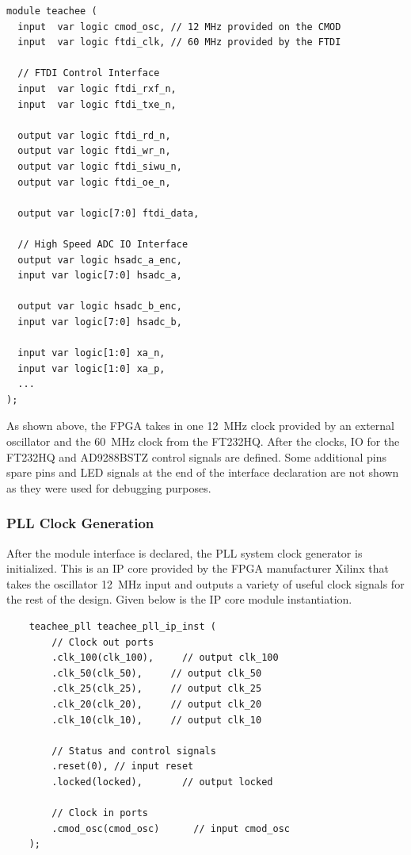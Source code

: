 \documentclass[letterpaper,11pt]{article}
\begin{document}
\begin{verbatim}
module teachee (
  input  var logic cmod_osc, // 12 MHz provided on the CMOD
  input  var logic ftdi_clk, // 60 MHz provided by the FTDI

  // FTDI Control Interface
  input  var logic ftdi_rxf_n,
  input  var logic ftdi_txe_n,

  output var logic ftdi_rd_n,
  output var logic ftdi_wr_n,
  output var logic ftdi_siwu_n,
  output var logic ftdi_oe_n,

  output var logic[7:0] ftdi_data,

  // High Speed ADC IO Interface
  output var logic hsadc_a_enc,
  input var logic[7:0] hsadc_a,

  output var logic hsadc_b_enc,
  input var logic[7:0] hsadc_b,

  input var logic[1:0] xa_n,
  input var logic[1:0] xa_p,
  ...
);
\end{verbatim}

As shown above, the FPGA takes in one \SI{12}{\mega\hertz} clock provided by an
external oscillator and the \SI{60}{\mega\hertz} clock from the FT232HQ. After
the clocks, IO for the FT232HQ and AD9288BSTZ control signals are defined. Some
additional pins spare pins and LED signals at the end of the interface
declaration are not shown as they were used for debugging purposes.

\subsubsection{PLL Clock Generation}
After the module interface is declared, the PLL system clock generator is
initialized. This is an IP core provided by the FPGA manufacturer Xilinx that
takes the oscillator \SI{12}{\mega\hertz} input and outputs a variety of useful
clock signals for the rest of the design. Given below is the IP core module
instantiation.

\begin{verbatim}
    teachee_pll teachee_pll_ip_inst (
        // Clock out ports
        .clk_100(clk_100),     // output clk_100
        .clk_50(clk_50),     // output clk_50
        .clk_25(clk_25),     // output clk_25
        .clk_20(clk_20),     // output clk_20
        .clk_10(clk_10),     // output clk_10

        // Status and control signals
        .reset(0), // input reset
        .locked(locked),       // output locked

        // Clock in ports
        .cmod_osc(cmod_osc)      // input cmod_osc
    );
\end{verbatim}
\end{document}
